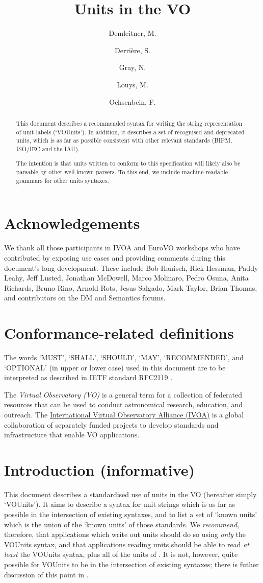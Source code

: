 \documentclass[11pt,a4paper]{ivoa}
\title{Units in the VO}
\author{Demleitner, M.}
\author{Derri\`ere, S.}
\author{Gray, N.}
\author{Louys, M.}
\author{Ochsenbein, F.}
\begin{document}
\begin{abstract}
This document describes a recommended syntax for writing the string
representation of unit labels (`VOUnits').  In addition, it describes
a set of recognised and deprecated units, which is as far as possible
consistent with other relevant standards (BIPM, ISO/IEC and the IAU).

The intention is that units written to conform to this specification
will likely also be parsable by other well-known parsers.  To this
end, we include machine-readable grammars for other units syntaxes.
\end{abstract}



\section*{Acknowledgements}

We thank all those participants in IVOA and EuroVO workshops who have
contributed by exposing use cases and providing comments during this
document's long development.  These include
Bob Hanisch,
Rick Hessman,
Paddy Leahy,
Jeff Lusted,
Jonathan McDowell,
Marco Molinaro,
Pedro Osuna,
Anita Richards,
Bruno Rino,
Arnold Rots,
Jesus Salgado,
Mark Taylor,
Brian Thomas,
and contributors on the DM and Semantics forums.

\section*{Conformance-related definitions}

The words `MUST', `SHALL', `SHOULD', `MAY', `RECOMMENDED', and
`OPTIONAL' (in upper or lower case) used in this document are to be
interpreted as described in IETF standard RFC2119 \citep{std:RFC2119}.

The \emph{Virtual Observatory (VO)} is a
general term for a collection of federated resources that can be used
to conduct astronomical research, education, and outreach.
The \href{https://www.ivoa.net}{International
Virtual Observatory Alliance (IVOA)} is a global
collaboration of separately funded projects to develop standards and
infrastructure that enable VO applications.


\section{Introduction (informative)}
\label{sec:intro}

This document describes a standardised use of units in the VO
(hereafter simply `VOUnits').  It aims to describe a syntax for unit
strings which is as far as possible in the intersection of existing
syntaxes, and to list a set of `known units' which is
the union of the `known units' of those standards.
We \emph{recommend}, therefore, that applications which write out
units should do so using \emph{only} the VOUnits syntax, and that
applications reading units should be able to read \emph{at least} the
VOUnits syntax, plus all of the units of .
It is not, however, quite possible for VOUnits to be in the
intersection of existing syntaxes; there is futher discussion of this
point in .
\end{document}
